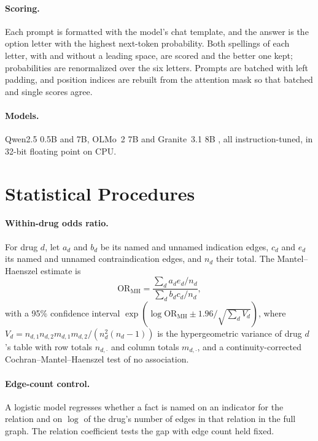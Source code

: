 \documentclass[letterpaper]{article} %
\begin{document}
\paragraph{Scoring.}
Each prompt is formatted with the model's chat template, and the answer is the
option letter with the highest next-token probability. Both spellings of each
letter, with and without a leading space, are scored and the better one kept;
probabilities are renormalized over the six letters. Prompts are batched with
left padding, and position indices are rebuilt from the attention mask so that
batched and single scores agree.

\paragraph{Models.}
Qwen2.5 0.5B and 7B, OLMo~2 7B \citep{olmo2024olmo2} and Granite~3.1 8B
\citep{granite2024}, all instruction-tuned, in 32-bit floating point on CPU.

\section{Statistical Procedures}

\paragraph{Within-drug odds ratio.}
For drug $d$, let $a_d$ and $b_d$ be its named and unnamed indication edges,
$c_d$ and $e_d$ its named and unnamed contraindication edges, and $n_d$ their
total. The Mantel--Haenszel estimate \citep{mantel1959} is
\begin{equation}
\mathrm{OR}_{\mathrm{MH}} = \frac{\sum_d a_d e_d / n_d}{\sum_d b_d c_d / n_d},
\end{equation}
with a 95\% confidence interval $\exp(\log \mathrm{OR}_{\mathrm{MH}} \pm
1.96/\sqrt{\sum_d V_d})$, where $V_d = n_{d,1} n_{d,2} m_{d,1} m_{d,2} / (n_d^2
(n_d - 1))$ is the hypergeometric variance of drug $d$'s table with row totals
$n_{d,\cdot}$ and column totals $m_{d,\cdot}$, and a continuity-corrected
Cochran--Mantel--Haenszel test of no association.

\paragraph{Edge-count control.}
A logistic model regresses whether a fact is named on an indicator for the
relation and on $\log$ of the drug's number of edges in that relation in the
full graph. The relation coefficient tests the gap with edge count held fixed.
\end{document}
